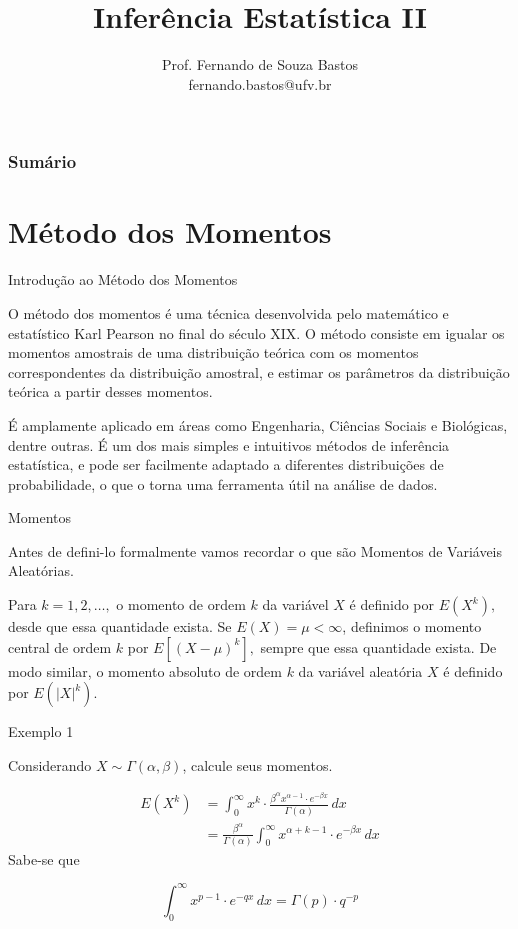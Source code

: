 \documentclass[12pt]{beamer}
\title{Inferência Estatística II}
\author{Prof. Fernando de Souza Bastos\texorpdfstring{\\ fernando.bastos@ufv.br}{}}
\institute{Departamento de Estatística\texorpdfstring{\\ Programa de Pós-Graduação em Estatística Aplicada e Biometria}\texorpdfstring{\\ Universidade Federal de Viçosa}{}\texorpdfstring{\\ Campus UFV - Viçosa}{}}
\date{}
\begin{document}

\frame{\titlepage}

\begin{frame}{}
\frametitle{\bf Sumário}
\tableofcontents
\end{frame}

\section{Método dos Momentos}
\begin{frame}{Introdução ao Método dos Momentos}
    \begin{block}{}
    \justifying
O método dos momentos é uma técnica desenvolvida pelo matemático e estatístico Karl Pearson no final do século XIX. O método consiste em igualar os momentos amostrais de uma distribuição teórica com os momentos correspondentes da distribuição amostral, e estimar os parâmetros da distribuição teórica a partir desses momentos.
\end{block}
\pause
\begin{block}{}
    \justifying
É amplamente aplicado em áreas como Engenharia, Ciências Sociais e Biológicas, dentre outras. É um dos mais simples e intuitivos métodos de inferência estatística, e pode ser facilmente adaptado a diferentes distribuições de probabilidade, o que o torna uma ferramenta útil na análise de dados.
\end{block}
\end{frame}

\begin{frame}{Momentos}
    \begin{block}{}
    \justifying
Antes de defini-lo formalmente vamos recordar o que são Momentos de Variáveis Aleatórias. 
\end{block}
\pause
\begin{definicao}\label{def4}
\justifying
    Para $k=1,2,\dots,$ o momento de ordem $k$ da variável $X$ é definido por $E(X^{k}),$ desde que essa quantidade exista. Se $E(X)=\mu<\infty$, definimos o momento central de ordem $k$ por $E[(X-\mu)^{k}],$ sempre que essa quantidade exista. De modo similar, o momento absoluto de ordem $k$ da variável aleatória $X$ é definido por $E(|X|^{k}).$
\end{definicao}
\end{frame}

\begin{frame}{Exemplo 1}
\begin{block}{}
\justifying
Considerando \( X \sim \Gamma(\alpha, \beta) \), calcule seus momentos.

\begin{align*}
E(X^k) &= \int_{0}^{\infty} x^k \cdot \frac{\beta^{\alpha}x^{\alpha-1} \cdot e^{-\beta x}}{\Gamma(\alpha)} \, dx \\
&=\frac{\beta^{\alpha}}{\Gamma(\alpha)} \int_{0}^{\infty} x^{\alpha + k - 1} \cdot e^{-\beta x} \, dx
\end{align*}
Sabe-se que

\[ \int_{0}^{\infty} x^{p-1} \cdot e^{-qx} \, dx = \Gamma(p) \cdot q^{-p} \]

\end{block}
\end{frame}
\end{document}
